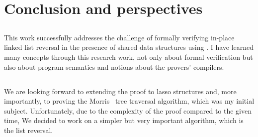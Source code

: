 \documentclass[11pt,a4paper]{article}
\begin{document}
\section{Conclusion and perspectives}
\subsection{}
This work successfully addresses the challenge of formally verifying in-place linked list reversal in the presence of shared data structures using \creusot{}. I have learned many concepts through this research work, not only about formal verification but also about program semantics and notions about the provers' compilers.

\subsection{}
We are looking forward to extending the proof to lasso structures and, more importantly, to proving the Morris~\cite{morris} tree traversal algorithm, which was my initial subject. Unfortunately, due to the complexity of the proof compared to the given time, We decided to work on a simpler but very important algorithm, which is the list reversal.
\newpage
\printbibliography

\newpage

\end{document}
